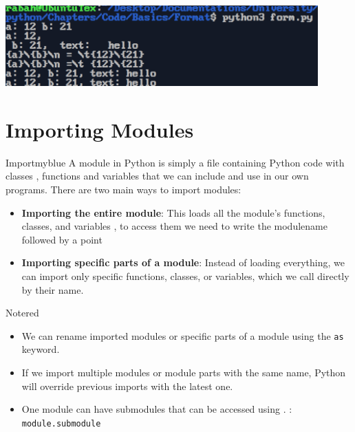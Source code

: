 \vspace{0.25cm}
\begin{center}
    \includegraphics[width = 0.9\textwidth]{Chapters/ScreenShot/Basics/Format/formatOutput.png}
\end{center}

\vspace{1cm}

\section{Importing Modules}

\begin{prettyBox}{Import}{myblue}
A module in Python is simply a file containing Python code with classes , functions and variables that we can include and use in our own programs. There are two main ways to import modules:
\begin{itemize}
    \item \textbf{Importing the entire module}: This loads all the module’s functions, classes, and variables , to access them we need to
        write the modulename followed by a point
    \item \textbf{Importing specific parts of a module}: Instead of loading everything, we can import only specific functions, classes, or variables, which
        we call directly by their name.
\end{itemize}
\end{prettyBox}

\vspace{0.5cm}

\begin{prettyBox}{Note}{red}
\begin{itemize}
    \item We can rename imported modules or specific parts of a module using the \texttt{as} keyword.
    \item If we import multiple modules or module parts with the same name, Python will override previous imports with the latest one.
    \item One module can have submodules that can be accessed using . : \texttt{module.submodule}
\end{itemize}
\end{prettyBox}

